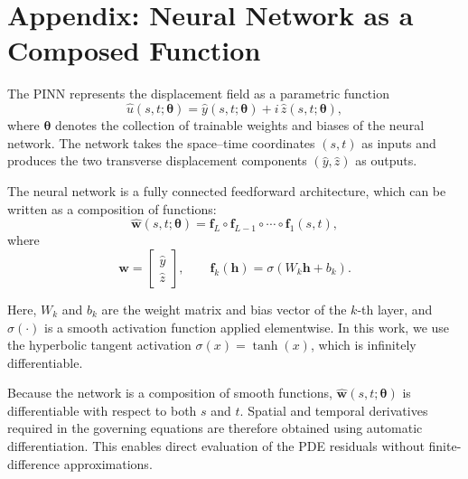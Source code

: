 \documentclass{article}
\begin{document}
\section{Appendix: Neural Network as a Composed Function}

The PINN represents the displacement field as a parametric function
\[
\hat{u}(s,t;\bm{\theta}) = \hat{y}(s,t;\bm{\theta}) + i\,\hat{z}(s,t;\bm{\theta}),
\]
where $\bm{\theta}$ denotes the collection of trainable weights and biases of the neural network. The network takes the space--time coordinates $(s,t)$ as inputs and produces the two transverse displacement components $(\hat{y},\hat{z})$ as outputs.

The neural network is a fully connected feedforward architecture, which can be written as a composition of functions:
\[
\hat{\mathbf{w}}(s,t;\bm{\theta})
= \mathbf{f}_L \circ \mathbf{f}_{L-1} \circ \cdots \circ \mathbf{f}_1 (s,t),
\]
where
\[
\hat{\mathbf{w}} = 
\begin{bmatrix}
\hat{y} \\[4pt]
\hat{z}
\end{bmatrix},
\qquad
\mathbf{f}_k(\mathbf{h}) = \sigma\!\left(W_k \mathbf{h} + b_k\right).
\]

Here, $W_k$ and $b_k$ are the weight matrix and bias vector of the $k$-th layer, and $\sigma(\cdot)$ is a smooth activation function applied elementwise. In this work, we use the hyperbolic tangent activation $\sigma(x) = \tanh(x)$, which is infinitely differentiable.

Because the network is a composition of smooth functions, $\hat{\mathbf{w}}(s,t;\bm{\theta})$ is differentiable with respect to both $s$ and $t$. Spatial and temporal derivatives required in the governing equations are therefore obtained using automatic differentiation. This enables direct evaluation of the PDE residuals without finite-difference approximations.

\end{document}
